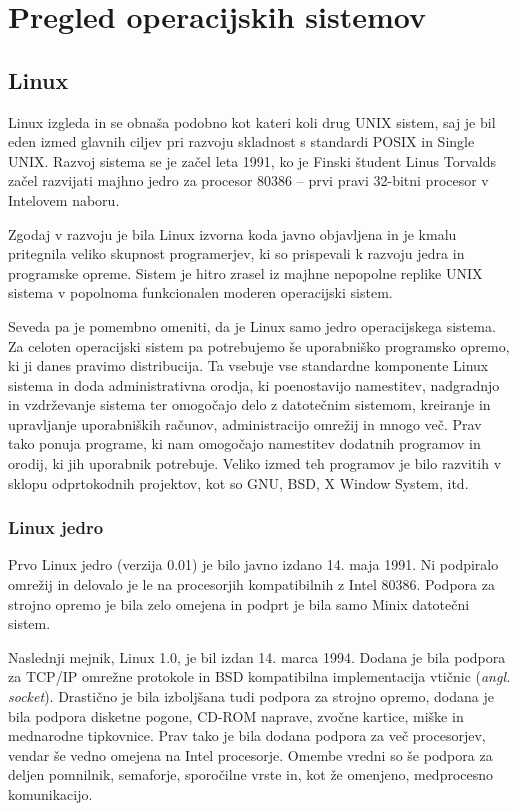\documentclass[a4paper,12pt,openright]{book}
\begin{document}
\section{Pregled operacijskih sistemov}

\subsection{Linux}

Linux izgleda in se obnaša podobno kot kateri koli drug UNIX sistem, saj je bil eden izmed glavnih ciljev pri razvoju skladnost s standardi POSIX in Single UNIX.
Razvoj sistema se je začel leta 1991, ko je Finski študent Linus Torvalds začel razvijati majhno jedro za procesor 80386 -- prvi pravi 32-bitni procesor v Intelovem naboru.

Zgodaj v razvoju je bila Linux izvorna koda javno objavljena in je kmalu pritegnila veliko skupnost programerjev, ki so prispevali k razvoju jedra in programske opreme.
Sistem je hitro zrasel iz majhne nepopolne replike UNIX sistema v popolnoma funkcionalen moderen operacijski sistem.

Seveda pa je pomembno omeniti, da je Linux samo jedro operacijskega sistema.
Za celoten operacijski sistem pa potrebujemo še uporabniško programsko opremo, ki ji danes pravimo distribucija.
Ta vsebuje vse standardne komponente Linux sistema in doda administrativna orodja, ki poenostavijo namestitev, nadgradnjo in vzdrževanje sistema ter omogočajo delo z datotečnim sistemom, kreiranje in upravljanje uporabniških računov, administracijo omrežij in mnogo več.
Prav tako ponuja programe, ki nam omogočajo namestitev dodatnih programov in orodij, ki jih uporabnik potrebuje.
Veliko izmed teh programov je bilo razvitih v sklopu odprtokodnih projektov, kot so GNU, BSD, X Window System, itd.
\cite{Silberschatz_Galvin_Gagne_2018}

\subsubsection{Linux jedro}

Prvo Linux jedro (verzija 0.01) je bilo javno izdano 14. maja 1991. Ni podpiralo omrežij in delovalo je le na procesorjih kompatibilnih z Intel 80386.
Podpora za strojno opremo je bila zelo omejena in podprt je bila samo Minix datotečni sistem.

Naslednji mejnik, Linux 1.0, je bil izdan 14. marca 1994. Dodana je bila podpora za TCP/IP omrežne protokole in BSD kompatibilna implementacija vtičnic (\textit{angl. socket}).
Drastično je bila izboljšana tudi podpora za strojno opremo, dodana je bila podpora disketne pogone, CD-ROM naprave, zvočne kartice, miške in mednarodne tipkovnice.
Prav tako je bila dodana podpora za več procesorjev, vendar še vedno omejena na Intel procesorje.
Omembe vredni so še podpora za deljen pomnilnik, semaforje, sporočilne vrste in, kot že omenjeno, medprocesno komunikacijo.
\end{document}
